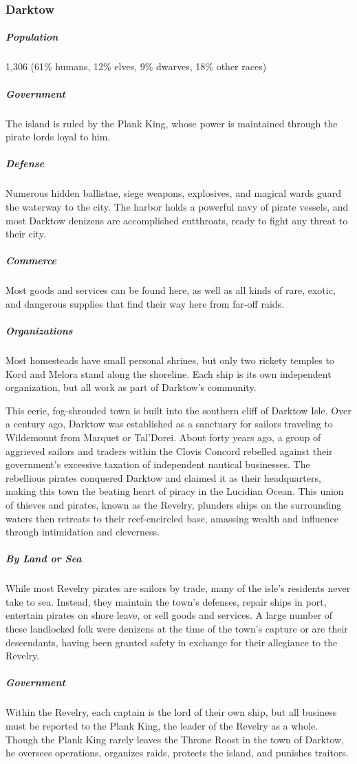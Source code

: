 \documentclass[10pt,a4paper,twoside,bg=print,twocolumn,openany,nodeprecatedcode]{dndbook}
\begin{document}
\subsubsection{Darktow}
\subparagraph{Population}
1,306 (61\% humans, 12\% elves, 9\% dwarves, 18\% other races)

\subparagraph{Government}
The island is ruled by the Plank King, whose power is maintained through the pirate lords loyal to him.

\subparagraph{Defense}
Numerous hidden ballistae, siege weapons, explosives, and magical wards guard the waterway to the city. The harbor holds a powerful navy of pirate vessels, and most Darktow denizens are accomplished cutthroats, ready to fight any threat to their city.

\subparagraph{Commerce}
Most goods and services can be found here, as well as all kinds of rare, exotic, and dangerous supplies that find their way here from far-off raids.

\subparagraph{Organizations}
Most homesteads have small personal shrines, but only two rickety temples to Kord and Melora stand along the shoreline. Each ship is its own independent organization, but all work as part of Darktow's community.

This eerie, fog-shrouded town is built into the southern cliff of Darktow Isle. Over a century ago, Darktow was established as a sanctuary for sailors traveling to Wildemount from Marquet or Tal'Dorei. About forty years ago, a group of aggrieved sailors and traders within the Clovis Concord rebelled against their government's excessive taxation of independent nautical businesses. The rebellious pirates conquered Darktow and claimed it as their headquarters, making this town the beating heart of piracy in the Lucidian Ocean. This union of thieves and pirates, known as the Revelry, plunders ships on the surrounding waters then retreats to their reef-encircled base, amassing wealth and influence through intimidation and cleverness.

\subparagraph{By Land or Sea}
While most Revelry pirates are sailors by trade, many of the isle's residents never take to sea. Instead, they maintain the town's defenses, repair ships in port, entertain pirates on shore leave, or sell goods and services. A large number of these landlocked folk were denizens at the time of the town's capture or are their descendants, having been granted safety in exchange for their allegiance to the Revelry.

\subparagraph{Government}
Within the Revelry, each captain is the lord of their own ship, but all business must be reported to the Plank King, the leader of the Revelry as a whole. Though the Plank King rarely leaves the Throne Roost in the town of Darktow, he oversees operations, organizes raids, protects the island, and punishes traitors.
\end{document}
